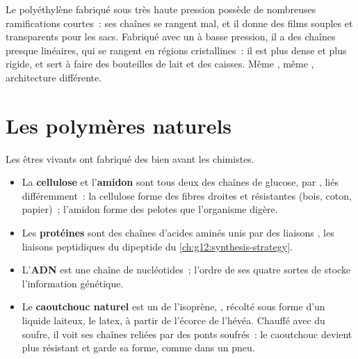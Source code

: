 \begin{example}\label{ex:g12:polymers:two-pe}
Le polyéthylène fabriqué sous très haute pression possède de nombreuses
ramifications courtes~: ses chaînes se rangent mal, et il donne des
films souples et transparents pour les sacs. Fabriqué avec un 
à basse pression, il a des chaînes presque linéaires, qui se rangent en
régions cristallines~: il est plus dense et plus rigide, et sert à faire
des bouteilles de lait et des caisses. Même , même ,
architecture différente.
\end{example}

\section{Les polymères naturels}

Les êtres vivants ont fabriqué des  bien avant les chimistes.

\begin{itemize}
  \item La \textbf{cellulose} et l'\textbf{amidon} sont tous deux des
        chaînes de  glucose,  par , liés
        différemment~: la cellulose forme des fibres droites et
        résistantes (bois, coton, papier)~; l'amidon forme des pelotes
        que l'organisme digère.
  \item Les \textbf{protéines} sont des chaînes d'acides aminés unis par
        des liaisons , les liaisons peptidiques du dipeptide du
        \cref{ch:g12:synthesis-strategy}.
  \item L'\textbf{ADN} est une chaîne de nucléotides~; l'ordre de ses
        quatre sortes de  stocke l'information génétique.
  \item Le \textbf{caoutchouc naturel} est un  de
        l'isoprène,
        , récolté sous forme d'un liquide laiteux, le
        latex, à partir de l'écorce de l'hévéa. Chauffé avec du soufre,
        il voit ses chaînes reliées par des ponts soufrés~: le caoutchouc
        devient plus résistant et garde sa forme, comme dans un pneu.
\end{itemize}

